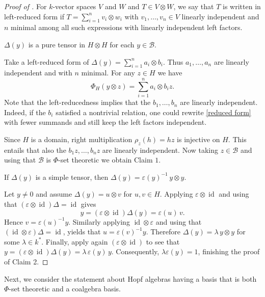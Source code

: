 \documentclass[a4paper,10pt]{amsart}
\theoremstyle{definition}
\theoremstyle{remark}
\DeclareMathOperator{\id}{id}
\newcommand\D{\Delta}
\newcommand\eps{\varepsilon}
\newcommand\ot{\otimes}
\newcommand\mc{\mathcal}
\begin{document}
\begin{proof}[Proof of ]
For $k$-vector spaces $V$ and $W$ and $T \in V \ot W$, we say that $T$ is written in left-reduced form if $T=\sum_{i=1}^n v_i\otimes w_i$
with $v_1,\dots,v_n\in V$ linearly independent and $n$ minimal among all such expressions with linearly independent left factors.\smallskip

 $\D (y)$ is a pure tensor in $H\otimes H$ for each $y\in \mc{B}$.\smallskip

Take a left-reduced form of  $\D (y)=\sum_{i=1}^n a_i\otimes b_i$. Thus $a_1,\dots,a_n$ are linearly independent and with $n$ minimal. For any $z\in H$ we have
\begin{equation}\label{reduced form}
\Phi_H(y\otimes z)=\sum_{i=1}^n a_i\otimes b_i z.
\end{equation}
Note that the left-reducedness implies that the $b_1, \ldots, b_n$ are linearly independent. Indeed, if the $b_i$ satisfied a nontrivial relation, one could rewrite \eqref{reduced form} with fewer summands and still keep the left factors independent. 

Since $H$ is a domain, right multiplication $\rho_z(h)=hz$ is injective on $H$. This entails that also the $b_1z, \ldots, b_nz$ are linearly independent. Now taking $z \in \mc{B}$ and using that $\mc{B}$ is $\Phi$-set theoretic we obtain Claim $1$.\medskip

If $\D (y)$ is a simple tensor, then $\D (y)=\eps(y)^{-1}\, y\otimes y$.\smallskip


Let $y \neq 0$ and assume $\D (y)=u\otimes v$ for $u,v \in H$. Applying $\eps\otimes \id$ and using that $(\eps \ot \id)\D = \id$ gives
\[
y=(\eps\otimes\id )\D (y)=\eps(u)\,v.
\]
Hence $v=\eps(u)^{-1}y$. Similarly applying $\id\ot \eps$ and using that $(\id \ot \eps)\D = \id$, yields that $u=\eps(v)^{-1}y$.
Therefore $\D(y)=\lambda\, y\ot y$ for some $\lambda\in k^*$. Finally, apply again $(\eps\ot \id)$ to see that $y=(\eps\ot \id)\D(y)=\lambda\,\eps(y)\,y. $ Consequently, $\lambda\eps(y)=1$, finishing the proof of Claim 2.
\end{proof}


Next, we consider the statement about Hopf algebras having a basis that is both $\Phi$-set theoretic and a coalgebra basis.
\end{document}
